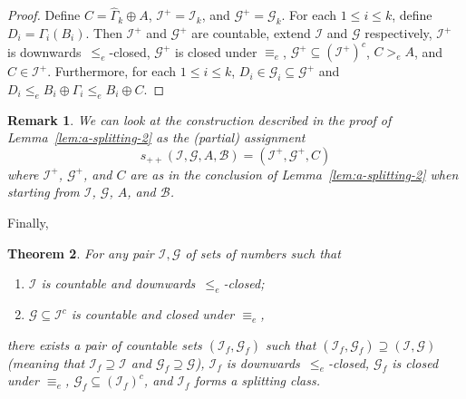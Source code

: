 \documentclass[11pt]{amsart}
\newtheorem{theorem}{Theorem}[section]
\newtheorem{rem}[theorem]{Remark}
\newenvironment{remark}{\begin{rem} \rm}{ \end{rem}}
\begin{document}
\begin{proof}
Define $C = \hat{\Gamma}_k \oplus A$, $\mathcal{I}^+= \mathcal{I}_k$, and 
$\mathcal{G}^+= \mathcal{G}_k$. For each $1 \leq i \leq k$, define $D_i = 
\Gamma_i(B_i)$. Then $\mathcal{I}^+$ and $\mathcal{G}^+$ are countable, 
extend $\mathcal{I}$ and $\mathcal{G}$ respectively, $\mathcal{I}^+$ is 
downwards~$\leq_e$-closed, $\mathcal{G}^+$ is closed under $\equiv_e$,  
$\mathcal{G}^+ \subseteq (\mathcal{I^+})^c$, $C  >_e A$, and $C \in 
\mathcal{I}^+$.  Furthermore, for each $1 \leq i \leq k$, $D_i \in 
\mathcal{G}_i \subseteq \mathcal{G}^+$ and $D_i \leq_e B_i \oplus \Gamma_i 
\leq_e B_i \oplus C$. 
\end{proof}

\begin{remark}\label{rem:final}
We can look at the construction described in the proof of 
Lemma~\ref{lem:a-splitting-2} as the (partial) assignment 
\[
s_{++}(\mathcal{I}, \mathcal{G}, A, \mathcal{B})= 
(\mathcal{I}^+, \mathcal{G}^+, C)
\] 
where $\mathcal{I}^+$, $\mathcal{G}^+$, and $C$ are as in the
conclusion of Lemma~\ref{lem:a-splitting-2} when starting from
$\mathcal{I}$, $\mathcal{G}$, $A$, and $\mathcal{B}$.
\end{remark}

Finally, 
\begin{theorem}\label{thm:final}
For any pair  $\mathcal{I},\mathcal{G}$ of sets of numbers such that 
\begin{enumerate}
  \item[(a)] $\mathcal{I}$ is countable and downwards~$\leq_e$-closed;
  \item[(b)] $\mathcal{G} \subseteq \mathcal{I}^c$ is countable and closed 
      under $\equiv_e$,
\end{enumerate} 
there exists a pair of countable sets $(\mathcal{I}_f, \mathcal{G}_f)$ such 
that $(\mathcal{I}_f, \mathcal{G}_f)\supseteq (\mathcal{I}, \mathcal{G})$ 
(meaning that $\mathcal{I}_f \supseteq \mathcal{I}$ and $\mathcal{G}_f 
\supseteq \mathcal{G}$), $\mathcal{I}_f$ is downwards~$\leq_e$-closed, 
$\mathcal{G}_f$ is closed under $\equiv_e$, $\mathcal{G}_f \subseteq 
(\mathcal{I}_f)^c$, and $\mathcal{I}_f$ forms a splitting class. 
\end{theorem}  
\end{document}
